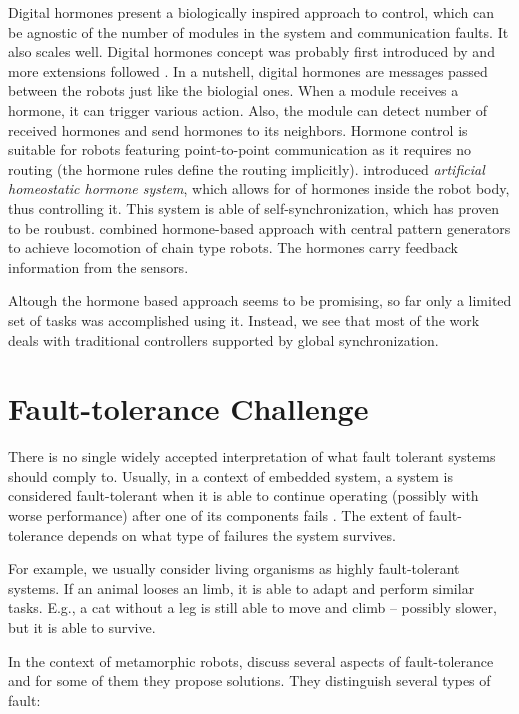 Digital hormones present a biologically inspired approach to control, which can
be agnostic of the number of modules in the system and communication faults. It
also scales well. Digital hormones concept was probably first introduced by
\textcite{DBLP:conf/agents/ShenLW00} and more extensions followed
\cite{DBLP:conf/icra/SalemiSW01, DBLP:journals/trob/ShenSW02}. In a nutshell,
digital hormones are messages passed between the robots just like the biologial
ones. When a module receives a hormone, it can trigger various action. Also, the
module can detect number of received hormones and send hormones to its
neighbors. Hormone control is suitable for robots featuring point-to-point
communication as it requires no routing (the hormone rules define the routing
implicitly). \textcite{DBLP:conf/cec/HamannSSC10} introduced \emph{artificial
homeostatic hormone system}, which allows for  of hormones inside
the robot body, thus controlling it. This system is able of
self-synchronization, which has proven to be roubust.
\textcite{DBLP:conf/icra/MorenoG11} combined hormone-based approach with central
pattern generators to achieve locomotion of chain type robots. The hormones
carry feedback information from the sensors.

Altough the hormone based approach seems to be promising, so far only a limited
set of tasks was accomplished using it. Instead, we see that most of the work
deals with traditional controllers supported by global synchronization.

\section{Fault-tolerance Challenge}

There is no single widely accepted interpretation of what fault tolerant systems
should comply to. Usually, in a context of embedded system, a system is
considered fault-tolerant when it is able to continue operating (possibly with
worse performance) after one of its components fails
\cite{DBLP:journals/micro/Johnson84}. The extent of fault-tolerance depends on
what type of failures the system survives.

For example, we usually consider living organisms as highly fault-tolerant
systems. If an animal looses an limb, it is able to adapt and perform similar
tasks. E.g., a cat without a leg is still able to move and climb -- possibly
slower, but it is able to survive.

In the context of metamorphic robots, \textcite{DKbotDistr} discuss several
aspects of fault-tolerance and for some of them they propose solutions. They
distinguish several types of fault:

